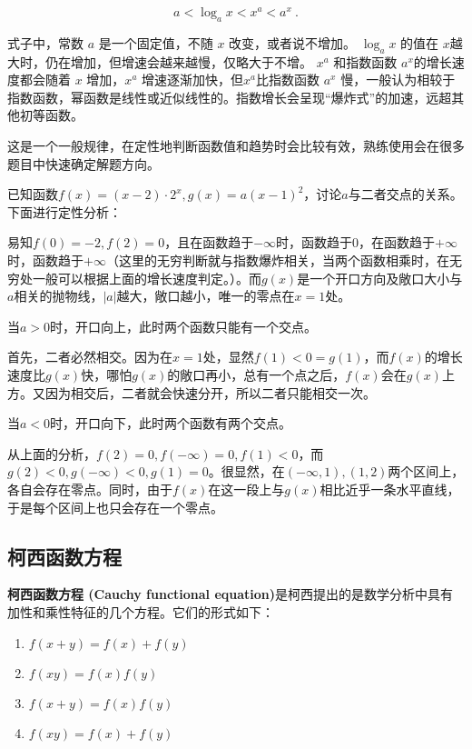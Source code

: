 \begin{equation}
 a < \log_a{x} <x^a < a^x~.
\end{equation}

式子中，常数 $a$ 是一个固定值，不随 $x$ 改变，或者说不增加。 $\log_a{x}$ 的值在 $x$越大时，仍在增加，但增速会越来越慢，仅略大于不增。 $x^a$ 和指数函数 $a^x$的增长速度都会随着 $x$ 增加，$x^a$ 增速逐渐加快，但$x^a$比指数函数 $a^x$ 慢，一般认为相较于指数函数，幂函数是线性或近似线性的。指数增长会呈现“爆炸式”的加速，远超其他初等函数。

这是一个一般规律，在定性地判断函数值和趋势时会比较有效，熟练使用会在很多题目中快速确定解题方向。

\begin{example}{已知函数$f(x)=(x-2)\cdot2^x,g(x)=a(x-1)^2$，讨论$a$与二者交点的关系。}
下面进行定性分析：

易知$f(0)=-2,f(2)=0$，且在函数趋于$-\infty$时，函数趋于$0$，在函数趋于$+\infty$时，函数趋于$+\infty$（这里的无穷判断就与指数爆炸相关，当两个函数相乘时，在无穷处一般可以根据上面的增长速度判定。）。而$g(x)$是一个开口方向及敞口大小与$a$相关的抛物线，$|a|$越大，敞口越小，唯一的零点在$x=1$处。

当$a>0$时，开口向上，此时两个函数只能有一个交点。

首先，二者必然相交。因为在$x=1$处，显然$f(1)<0=g(1)$，而$f(x)$的增长速度比$g(x)$快，哪怕$g(x)$的敞口再小，总有一个点之后，$f(x)$会在$g(x)$上方。又因为相交后，二者就会快速分开，所以二者只能相交一次。

当$a<0$时，开口向下，此时两个函数有两个交点。

从上面的分析，$f(2)=0,f(-\infty)=0,f(1)<0$，而$g(2)<0,g(-\infty)<0,g(1)=0$。很显然，在$(-\infty,1),(1,2)$两个区间上，各自会存在零点。同时，由于$f(x)$在这一段上与$g(x)$相比近乎一条水平直线，于是每个区间上也只会存在一个零点。

\end{example}

\subsection{柯西函数方程}

\textbf{柯西函数方程 (Cauchy functional equation)}是柯西提出的是数学分析中具有加性和乘性特征的几个方程。它们的形式如下：
\begin{enumerate}
\item $f(x+y)=f(x)+f(y)$
\item $f(xy) = f(x) f(y)$
\item $f(x+y)=f(x)f(y)$
\item $f(xy) = f(x)+f(y)$
\end{enumerate}

